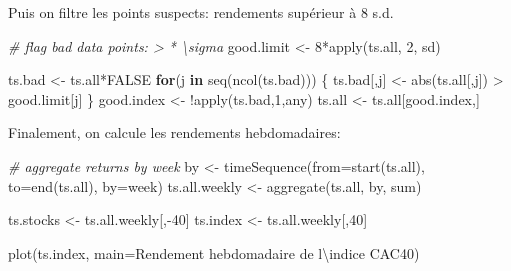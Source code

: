 \documentclass[
]{article}
\newenvironment{Shaded}{\begin{snugshade}}{\end{snugshade}}
\newcommand{\AttributeTok}[1]{\textcolor[rgb]{0.77,0.63,0.00}{#1}}
\newcommand{\CommentTok}[1]{\textcolor[rgb]{0.56,0.35,0.01}{\textit{#1}}}
\newcommand{\ConstantTok}[1]{\textcolor[rgb]{0.00,0.00,0.00}{#1}}
\newcommand{\ControlFlowTok}[1]{\textcolor[rgb]{0.13,0.29,0.53}{\textbf{#1}}}
\newcommand{\DecValTok}[1]{\textcolor[rgb]{0.00,0.00,0.81}{#1}}
\newcommand{\FunctionTok}[1]{\textcolor[rgb]{0.00,0.00,0.00}{#1}}
\newcommand{\NormalTok}[1]{#1}
\newcommand{\OtherTok}[1]{\textcolor[rgb]{0.56,0.35,0.01}{#1}}
\newcommand{\SpecialCharTok}[1]{\textcolor[rgb]{0.00,0.00,0.00}{#1}}
\newcommand{\StringTok}[1]{\textcolor[rgb]{0.31,0.60,0.02}{#1}}
\begin{document}
Puis on filtre les points suspects: rendements supérieur à 8 s.d.

\begin{Shaded}
\begin{Highlighting}[]
  \CommentTok{\# flag bad data points: \textgreater{} * \textbackslash{}sigma}
\NormalTok{  good.limit }\OtherTok{\textless{}{-}} \DecValTok{8}\SpecialCharTok{*}\FunctionTok{apply}\NormalTok{(ts.all, }\DecValTok{2}\NormalTok{, sd)}
  
\NormalTok{  ts.bad }\OtherTok{\textless{}{-}}\NormalTok{ ts.all}\SpecialCharTok{*}\ConstantTok{FALSE}
  \ControlFlowTok{for}\NormalTok{(j }\ControlFlowTok{in} \FunctionTok{seq}\NormalTok{(}\FunctionTok{ncol}\NormalTok{(ts.bad))) \{}
\NormalTok{    ts.bad[,j] }\OtherTok{\textless{}{-}} \FunctionTok{abs}\NormalTok{(ts.all[,j]) }\SpecialCharTok{\textgreater{}}\NormalTok{ good.limit[j]}
\NormalTok{  \}}
\NormalTok{  good.index }\OtherTok{\textless{}{-}} \SpecialCharTok{!}\FunctionTok{apply}\NormalTok{(ts.bad,}\DecValTok{1}\NormalTok{,any)}
\NormalTok{  ts.all }\OtherTok{\textless{}{-}}\NormalTok{ ts.all[good.index,]}
\end{Highlighting}
\end{Shaded}

Finalement, on calcule les rendements hebdomadaires:

\begin{Shaded}
\begin{Highlighting}[]
  \CommentTok{\# aggregate returns by week}
\NormalTok{  by }\OtherTok{\textless{}{-}} \FunctionTok{timeSequence}\NormalTok{(}\AttributeTok{from=}\FunctionTok{start}\NormalTok{(ts.all), }
                     \AttributeTok{to=}\FunctionTok{end}\NormalTok{(ts.all), }\AttributeTok{by=}\StringTok{\textquotesingle{}week\textquotesingle{}}\NormalTok{)}
\NormalTok{  ts.all.weekly }\OtherTok{\textless{}{-}} \FunctionTok{aggregate}\NormalTok{(ts.all, by, sum)}

\NormalTok{  ts.stocks }\OtherTok{\textless{}{-}}\NormalTok{ ts.all.weekly[,}\SpecialCharTok{{-}}\DecValTok{40}\NormalTok{]}
\NormalTok{  ts.index }\OtherTok{\textless{}{-}}\NormalTok{ ts.all.weekly[,}\DecValTok{40}\NormalTok{]}
\end{Highlighting}
\end{Shaded}

\begin{Shaded}
\begin{Highlighting}[]
\FunctionTok{plot}\NormalTok{(ts.index, }\AttributeTok{main=}\StringTok{\textquotesingle{}Rendement hebdomadaire de l}\SpecialCharTok{\textbackslash{}\textquotesingle{}}\StringTok{indice CAC40\textquotesingle{}}\NormalTok{)}
\end{Highlighting}
\end{Shaded}
\end{document}
